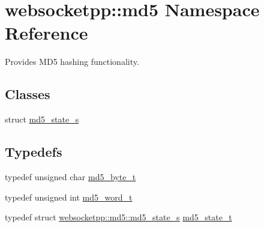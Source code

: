 \hypertarget{namespacewebsocketpp_1_1md5}{}\section{websocketpp\+:\+:md5 Namespace Reference}
\label{namespacewebsocketpp_1_1md5}


Provides M\+D5 hashing functionality.  


\subsection*{Classes}
\begin{DoxyCompactItemize}
\item 
struct \hyperlink{structwebsocketpp_1_1md5_1_1md5__state__s}{md5\+\_\+state\+\_\+s}
\end{DoxyCompactItemize}
\subsection*{Typedefs}
\begin{DoxyCompactItemize}
\item 
typedef unsigned char \hyperlink{namespacewebsocketpp_1_1md5_a0c434041715d244182207c3413e36e71}{md5\+\_\+byte\+\_\+t}
\item 
typedef unsigned int \hyperlink{namespacewebsocketpp_1_1md5_a0ece422ac11bb1332dcf342ced42ac96}{md5\+\_\+word\+\_\+t}
\item 
typedef struct \hyperlink{structwebsocketpp_1_1md5_1_1md5__state__s}{websocketpp\+::md5\+::md5\+\_\+state\+\_\+s} \hyperlink{namespacewebsocketpp_1_1md5_a4be84c20ee3f9d9c76d4e2f7befe2eff}{md5\+\_\+state\+\_\+t}
\end{DoxyCompactItemize}
